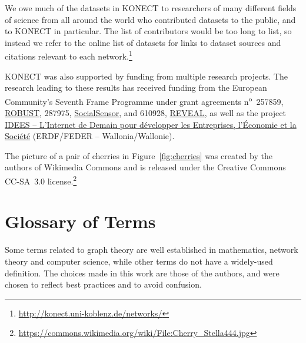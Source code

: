 \documentclass{article}
\begin{document}
We owe much of the datasets in KONECT to researchers of many different
fields of science from all around the world who contributed datasets to
the public, and to KONECT in particular.  The list of contributors would
be too long to list, so instead we refer to the online list of datasets
for links to dataset sources and citations relevant to each
network.\footnote{\url{http://konect.uni-koblenz.de/networks/}}

KONECT was also supported by funding from multiple research projects. 
The research leading to
these results has received funding from the European Community's Seventh
Frame Programme under grant agreements n\textsuperscript{o}~257859,
\href{http://robust-project.eu/}{ROBUST}, 287975,
\href{http://www.socialsensor.eu/}{SocialSensor}, and 610928,
\href{http://revealproject.eu/}{REVEAL}, as well as the project
\href{http://nouvelles.unamur.be/upnews.2015-10-01.8995593781}{IDEES --
  L'Internet de Demain pour développer les Entreprises, l'Économie et la
  Société} (ERDF/FEDER -- Wallonia/Wallonie). 

The picture of a pair of cherries in Figure~\ref{fig:cherries} was
created by the authors of Wikimedia Commons and is released under the
Creative Commons CC-SA~3.0 license.\footnote{\url{https://commons.wikimedia.org/wiki/File:Cherry_Stella444.jpg}}

\let\oldbibliography\thebibliography
\renewcommand{\thebibliography}[1]{%
  \oldbibliography{#1}%
  \setlength{\itemsep}{0pt}%
}



\appendix

\section{Glossary of Terms}

Some terms related to graph theory are well established in mathematics,
network theory and computer science, while other terms do not have a
widely-used definition.  
The choices made in this work are those of the authors, and were chosen
to reflect best practices and to avoid confusion.
\end{document}
